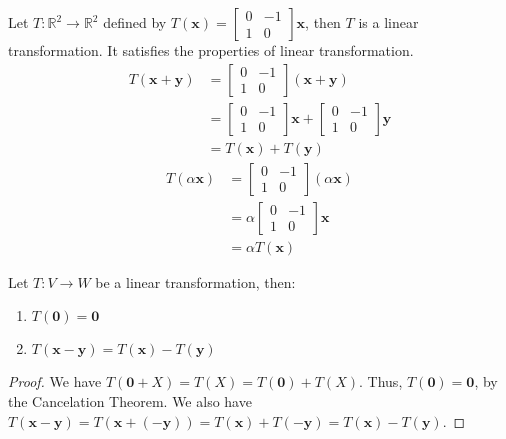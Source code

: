 \documentclass[11pt]{article}
\begin{document}
\begin{example}
    Let $T: \mathbb{R}^2 \rightarrow \mathbb{R}^2$ defined by $T(\textbf{x}) = \begin{bmatrix} 0 & -1 \\ 1 & 0 \end{bmatrix}\textbf{x}$, then $T$ is a linear transformation. It satisfies the properties of linear transformation.
    \begin{align*}
        T(\textbf{x} + \textbf{y}) &= \begin{bmatrix} 0 & -1 \\ 1 & 0 \end{bmatrix}(\textbf{x} + \textbf{y}) \\
        &= \begin{bmatrix} 0 & -1 \\ 1 & 0 \end{bmatrix}\textbf{x} + \begin{bmatrix} 0 & -1 \\ 1 & 0 \end{bmatrix}\textbf{y} \\
        &= T(\textbf{x}) + T(\textbf{y})
    \end{align*}
    \begin{align*}
        T(\alpha \textbf{x}) &= \begin{bmatrix} 0 & -1 \\ 1 & 0 \end{bmatrix}(\alpha \textbf{x}) \\
        &= \alpha \begin{bmatrix} 0 & -1 \\ 1 & 0 \end{bmatrix}\textbf{x} \\
        &= \alpha T(\textbf{x})
    \end{align*}
    
\end{example}
\begin{theorem}
    Let $T: V \rightarrow W$ be a linear transformation, then:
    \begin{enumerate}
        \item $T(\textbf{0}) = \textbf{0}$
        \item $T(\textbf{x} - \textbf{y}) = T(\textbf{x}) - T(\textbf{y})$
    \end{enumerate}
\end{theorem}
\begin{proof}
    We have $T(\textbf{0} + X) = T(X) = T(\textbf{0}) + T(X)$. Thus, $T(\textbf{0}) = \textbf{0}$, by the Cancelation Theorem. We also have $T(\textbf{x} - \textbf{y}) = T(\textbf{x} + (-\textbf{y})) = T(\textbf{x}) + T(-\textbf{y}) = T(\textbf{x}) - T(\textbf{y})$.
\end{proof}
\end{document}
